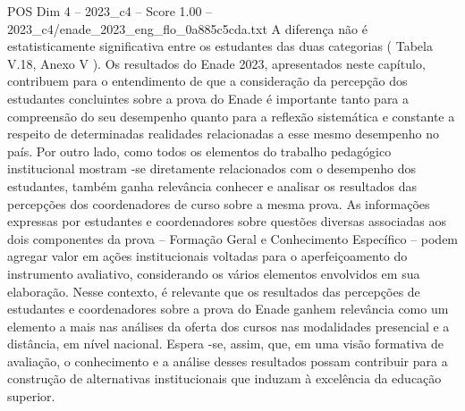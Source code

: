 \begin{textsample}{POS Dim 4 – 2023\_c4 – Score 1.00 – 2023\_c4/enade\_2023\_eng\_flo\_0a885c5cda.txt}
A diferença não é estatisticamente significativa entre os estudantes das duas categorias ( Tabela V.18, Anexo V ).
Os resultados do Enade 2023, apresentados neste capítulo, contribuem para o entendimento de que a consideração da percepção dos estudantes concluintes sobre a prova do Enade é importante tanto para a compreensão do seu desempenho quanto para a reflexão sistemática e constante a respeito de determinadas realidades relacionadas a esse mesmo desempenho no país.
Por outro lado, como todos os elementos do trabalho pedagógico institucional mostram -se diretamente relacionados com o desempenho dos estudantes, também ganha relevância conhecer e analisar os resultados das percepções dos coordenadores de curso sobre a mesma prova.
As informações expressas por estudantes e coordenadores sobre questões diversas associadas aos dois componentes da prova – Formação Geral e Conhecimento Específico – podem agregar valor em ações institucionais voltadas para o aperfeiçoamento do instrumento avaliativo, considerando os vários elementos envolvidos em sua elaboração.
Nesse contexto, é relevante que os resultados das percepções de estudantes e coordenadores sobre a prova do Enade ganhem relevância como um elemento a mais nas análises da oferta dos cursos nas modalidades presencial e a distância, em nível nacional.
Espera -se, assim, que, em uma visão formativa de avaliação, o conhecimento e a análise desses resultados possam contribuir para a construção de alternativas institucionais que induzam à excelência da educação superior.

\end{textsample}
